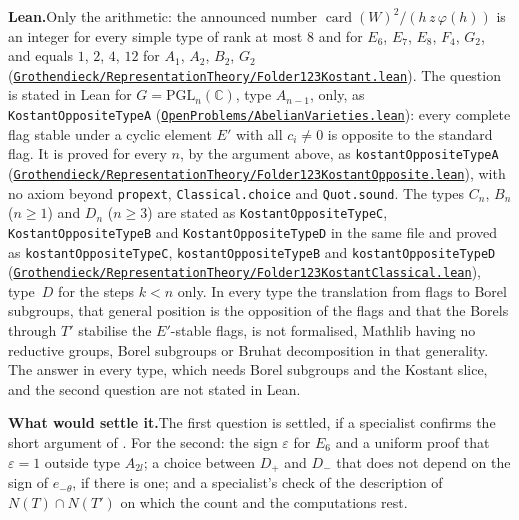 \documentclass[11pt]{article}
\theoremstyle{definition}
\theoremstyle{plain}\newtheorem*{proposition}{Proposition}\theoremstyle{definition}
\newcommand{\entry}[1]{\par\medskip\noindent\textbf{#1}\enspace}
\newcommand{\leanst}{\entry{Lean.}}
\newcommand{\leanop}[1]{\href{https://github.com/Commutator-IO/GrothendieckArchivesProofs/blob/main/OpenProblems/#1.lean}{\nolinkurl{OpenProblems/#1.lean}}}
\newcommand{\settle}{\entry{What would settle it.}}
\begin{document}
\leanst Only the arithmetic: the announced number $\operatorname{card}(W)^2/(h\,z\,\varphi(h))$ is an integer for every simple type of rank at most $8$ and for $E_6$, $E_7$, $E_8$, $F_4$, $G_2$, and equals $1$, $2$, $4$, $12$ for $A_1$, $A_2$, $B_2$, $G_2$ (\href{https://github.com/Commutator-IO/GrothendieckArchivesProofs/blob/main/Grothendieck/RepresentationTheory/Folder123Kostant.lean}{\nolinkurl{Grothendieck/RepresentationTheory/Folder123Kostant.lean}}). The question is stated in Lean for $G = \mathrm{PGL}_n(\mathbb C)$, type $A_{n-1}$, only, as \texttt{KostantOppositeTypeA} (\leanop{AbelianVarieties}): every complete flag stable under a cyclic element $E'$ with all $c_i \ne 0$ is opposite to the standard flag. It is proved for every $n$, by the argument above, as \texttt{kostantOppositeTypeA} (\href{https://github.com/Commutator-IO/GrothendieckArchivesProofs/blob/main/Grothendieck/RepresentationTheory/Folder123KostantOpposite.lean}{\nolinkurl{Grothendieck/RepresentationTheory/Folder123KostantOpposite.lean}}), with no axiom beyond \texttt{propext}, \texttt{Classical.choice} and \texttt{Quot.sound}. The types $C_n$, $B_n$ ($n \geq 1$) and $D_n$ ($n \geq 3$) are stated as \texttt{KostantOppositeTypeC}, \texttt{KostantOppositeTypeB} and \texttt{KostantOppositeTypeD} in the same file and proved as \texttt{kostantOppositeTypeC}, \texttt{kostantOppositeTypeB} and \texttt{kostantOppositeTypeD} (\href{https://github.com/Commutator-IO/GrothendieckArchivesProofs/blob/main/Grothendieck/RepresentationTheory/Folder123KostantClassical.lean}{\nolinkurl{Grothendieck/RepresentationTheory/Folder123KostantClassical.lean}}), type~$D$ for the steps $k < n$ only. In every type the translation from flags to Borel subgroups, that general position is the opposition of the flags and that the Borels through $T'$ stabilise the $E'$-stable flags, is not formalised, Mathlib having no reductive groups, Borel subgroups or Bruhat decomposition in that generality. The answer in every type, which needs Borel subgroups and the Kostant slice, and the second question are not stated in Lean.

\settle The first question is settled, if a specialist confirms the short argument of \cite{kostantnote}. For the second: the sign $\varepsilon$ for $E_6$ and a uniform proof that $\varepsilon = 1$ outside type $A_{2l}$; a choice between $D_+$ and $D_-$ that does not depend on the sign of $e_{-\theta}$, if there is one; and a specialist's check of the description of $N(T) \cap N(T')$ on which the count and the computations rest.
\end{document}
